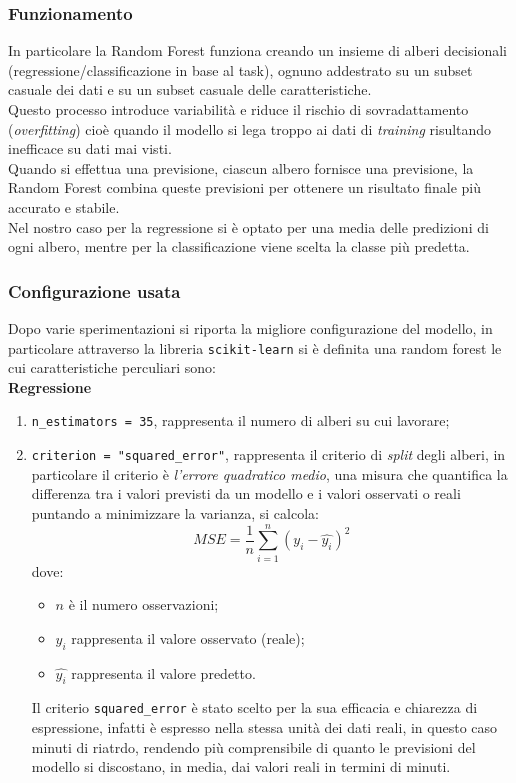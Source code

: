 \documentclass[italian,12pt,a4paper]{article}
\begin{document}
			\subsubsection{Funzionamento}
				In particolare la Random Forest funziona creando un insieme di alberi decisionali (regressione/classificazione in base al task), ognuno addestrato su un subset casuale dei dati e su un subset casuale delle caratteristiche.\\
				Questo processo introduce variabilità e riduce il rischio di sovradattamento (\textit{overfitting}) cioè quando il modello si lega troppo ai dati di \textit{training} risultando inefficace su dati mai visti.\\ Quando si effettua una previsione, ciascun albero fornisce una previsione, la Random Forest combina queste previsioni per ottenere un risultato finale più accurato e stabile.\\
				\linebreak
				Nel nostro caso per la regressione si è optato per una media delle predizioni di ogni albero, mentre per la classificazione viene scelta la classe più predetta.
			\subsubsection{Configurazione usata}
				Dopo varie sperimentazioni si riporta la migliore configurazione del modello, in particolare attraverso la libreria \texttt{scikit-learn} \cite{scikit_learn} si è definita una random forest le cui caratteristiche perculiari sono:\\
				\linebreak
				\textbf{Regressione}
				 
					\begin{enumerate}
						
						\item \texttt{n\_estimators = 35}, rappresenta il numero di alberi su cui lavorare;
						\item  \texttt{criterion = "squared\_error"},  rappresenta il criterio di \textit{split} degli alberi, in particolare il criterio è \textit{l'errore quadratico medio}, una misura che quantifica la differenza tra i valori previsti da un modello e i valori osservati o reali puntando a minimizzare la varianza, si calcola:
							$$MSE = \frac{1}{n}\sum_{i = 1}^{n}(y_i - \hat{y_i})^2$$
						dove:
							\begin{itemize}
								\item $n$ è il numero osservazioni;
								\item $y_i$ rappresenta il valore osservato (reale);
								\item $\hat{y_i}$ rappresenta il valore predetto.
							\end{itemize}
			
						Il criterio \texttt{squared\_error} è stato scelto per la sua efficacia e chiarezza di espressione, infatti è espresso nella stessa unità dei dati reali, in questo caso minuti di riatrdo, rendendo più comprensibile di quanto le previsioni del modello si discostano, in media, dai valori reali in termini di minuti.
					
					\end{enumerate}
		
\end{document}
